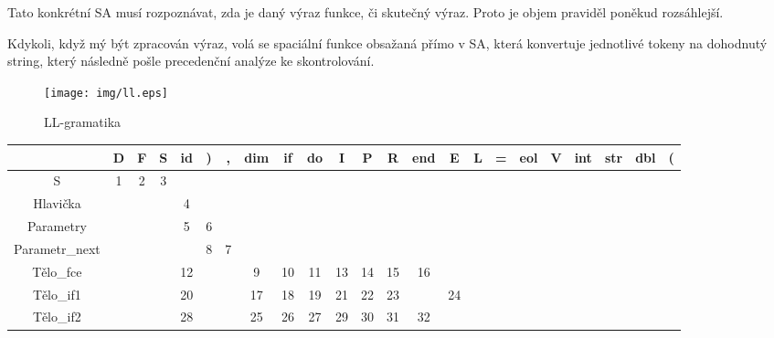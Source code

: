 \documentclass[11pt, a4paper]{article}
\begin{document}
		Tato konkrétní SA musí rozpoznávat, zda je daný výraz funkce, či skutečný výraz. Proto je objem praviděl poněkud rozsáhlejší. 
		
		Kdykoli, když mý být zpracován výraz, volá se spaciální funkce obsažaná přímo v SA, která konvertuje jednotlivé tokeny na dohodnutý string, který následně pošle precedenční analýze ke skontrolování. 
		\begin{figure}
			\texttt{[image: img/ll.eps]}
			\caption{LL-gramatika}
			\label{ll}
		\end{figure}
		\begin{table}[H]
			\centering
			{\scriptsize {\renewcommand{\arraystretch}{1.2}
			\addtolength{\tabcolsep}{-1.1pt}
			\begin{tabular}{|c|c|c|c|c|c|c|c|c|c|c|c|c|c|c|c|c|c|c|c|c|c|c|}
				\hline
				& D & F & S & id & )  & ,  & dim & if & do & I & P & R & end & E & L & =  & eol & V & int & str & dbl & (  \\ \hline
				S                   & 1       & 2        & 3     &    &    &    &     &    &    &       &       &        &     &      &      &    &     &         &         &        &        &    \\ \hline
				Hlavička            &         &          &       & 4  &    &    &     &    &    &       &       &        &     &      &      &    &     &         &         &        &        &    \\ \hline
				Parametry           &         &          &       & 5  & 6  &    &     &    &    &       &       &        &     &      &      &    &     &         &         &        &        &    \\ \hline
				Parametr\_next      &         &          &       &    & 8  & 7  &     &    &    &       &       &        &     &      &      &    &     &         &         &        &        &    \\ \hline
				Tělo\_fce           &         &          &       & 12 &    &    & 9   & 10 & 11 & 13    & 14    & 15     & 16  &      &      &    &     &         &         &        &        &    \\ \hline
				Tělo\_if1           &         &          &       & 20 &    &    & 17  & 18 & 19 & 21    & 22    & 23     &     & 24   &      &    &     &         &         &        &        &    \\ \hline
				Tělo\_if2           &         &          &       & 28 &    &    & 25  & 26 & 27 & 29    & 30    & 31     & 32  &      &      &    &     &         &         &        &        &    \\ \hline

\end{tabular}}}
\end{table}
\end{document}

